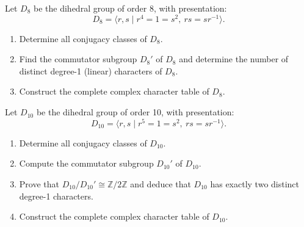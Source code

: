 \begin{prob}[F2004-Q6]
    Let \( D_8 \) be the dihedral group of order 8, with presentation:
    \[
    D_8 = \langle r, s \mid r^4 = 1 = s^2,\ rs = sr^{-1} \rangle.
    \]
    
    \begin{enumerate}
        \item Determine all conjugacy classes of \( D_8 \).
        
        \item Find the commutator subgroup \( D_8' \) of \( D_8 \) and determine the number of distinct degree-1 (linear) characters of \( D_8 \).
        
        \item Construct the complete complex character table of \( D_8 \).
    \end{enumerate}
\end{prob}

\begin{prob}[F2000-Q7]
    Let \( D_{10} \) be the dihedral group of order 10, with presentation:
    \[
    D_{10} = \langle r, s \mid r^5 = 1 = s^2,\ rs = sr^{-1} \rangle.
    \]
    
    \begin{enumerate}
        \item Determine all conjugacy classes of \( D_{10} \).
        
        \item Compute the commutator subgroup \( D_{10}' \) of \( D_{10} \).
        
        \item Prove that \( D_{10}/D_{10}' \cong \mathbb{Z}/2\mathbb{Z} \) and deduce that \( D_{10} \) has exactly two distinct degree-1 characters.
        
        \item Construct the complete complex character table of \( D_{10} \).
    \end{enumerate}
\end{prob}



















